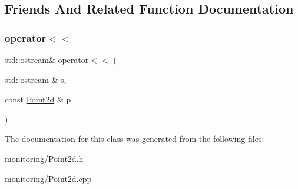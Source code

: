 \subsection{Friends And Related Function Documentation}
\mbox{\label{class_point2d_a366fa3756254cd9da337c606d8ce1b10}} 
\subsubsection{\texorpdfstring{operator$<$$<$}{operator<<}}
{\footnotesize\ttfamily std\+::ostream\& operator$<$$<$ (\begin{DoxyParamCaption}\item[{std\+::ostream \&}]{s,  }\item[{const \hyperlink{class_point2d}{Point2d} \&}]{p }\end{DoxyParamCaption})\hspace{0.3cm}{\ttfamily [friend]}}



The documentation for this class was generated from the following files\+:\begin{DoxyCompactItemize}
\item 
monitoring/\hyperlink{_point2d_8h}{Point2d.\+h}\item 
monitoring/\hyperlink{_point2d_8cpp}{Point2d.\+cpp}\end{DoxyCompactItemize}
